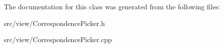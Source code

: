 The documentation for this class was generated from the following files\+:\begin{DoxyCompactItemize}
\item 
src/view/Correspondence\+Picker.\+h\item 
src/view/Correspondence\+Picker.\+cpp\end{DoxyCompactItemize}
